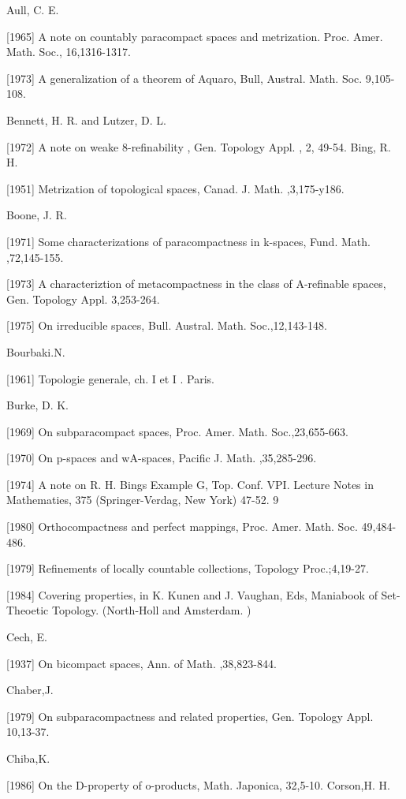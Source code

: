 \documentclass[main.tex]{subfiles}
\begin{document}
\noindent Aull, C. E.

[1965]
A note on countably paracompact spaces and metrization. Proc.
Amer. Math. Soc., 16,1316-1317.

[1973]
A generalization of a theorem of Aquaro, Bull, Austral. Math. Soc.
9,105-108.

\noindent Bennett, H. R. and Lutzer, D. L.

[1972] A note on weake 8-refinability , Gen. Topology Appl. , 2, 49-54.
Bing, R. H.

[1951] Metrization of topological spaces, Canad. J. Math. ,3,175-y186.

Boone, J. R.

[1971]
Some characterizations of paracompactness in k-spaces, Fund.
Math. ,72,145-155.

[1973] A characteriztion of metacompactness in the class of A-refinable
spaces, Gen. Topology Appl. 3,253-264.

[1975] On irreducible spaces, Bull. Austral. Math. Soc.,12,143-148.

\noindent Bourbaki.N.

[1961] Topologie generale, ch. I et I . Paris.


\noindent Burke, D. K.

[1969] On subparacompact spaces, Proc. Amer. Math. Soc.,23,655-663.

[1970] On p-spaces and wA-spaces, Pacific J. Math. ,35,285-296.

[1974] A note on R. H. Bings Example G, Top. Conf. VPI. Lecture Notes in
Mathematies, 375 (Springer-Verdag, New York) 47-52. 9

[1980] Orthocompactness and perfect mappings, Proc. Amer. Math. Soc.
49,484-486.

[1979] Refinements of locally countable collections, Topology Proc.;4,19-27.

[1984] Covering properties, in  K. Kunen and J. Vaughan, Eds, Maniabook of Set-Theoetic Topology. (North-Holl and Amsterdam. )


\noindent Cech, E.

[1937] On bicompact spaces, Ann. of Math. ,38,823-844.

\noindent Chaber,J.

[1979] On subparacompactness and related properties, Gen. Topology Appl.
10,13-37.

\noindent Chiba,K.

[1986] On the D-property of o-products, Math. Japonica, 32,5-10.
Corson,H. H.
\end{document}
